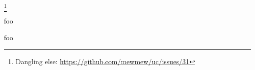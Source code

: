 
\footnote{Dangling else: \url{https://github.com/mewmew/uc/issues/31}}

foo


foo

%
%
%
%
%





%
%
%
%

%
%

